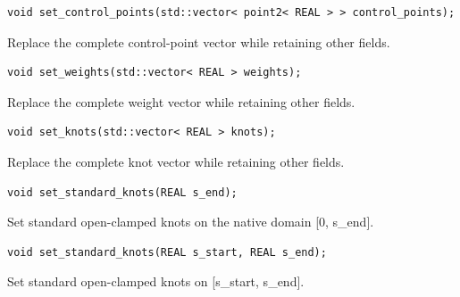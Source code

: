 \par\noindent\begin{minipage}{\linewidth}
\begin{lstlisting}[style=apireference]
void set_control_points(std::vector< point2< REAL > > control_points);
\end{lstlisting}
{\footnotesize Replace the complete control-point vector while retaining other fields.\par}
\end{minipage}\par\vspace{1pt}
\par\noindent\begin{minipage}{\linewidth}
\begin{lstlisting}[style=apireference]
void set_weights(std::vector< REAL > weights);
\end{lstlisting}
{\footnotesize Replace the complete weight vector while retaining other fields.\par}
\end{minipage}\par\vspace{1pt}
\par\noindent\begin{minipage}{\linewidth}
\begin{lstlisting}[style=apireference]
void set_knots(std::vector< REAL > knots);
\end{lstlisting}
{\footnotesize Replace the complete knot vector while retaining other fields.\par}
\end{minipage}\par\vspace{1pt}
\par\noindent\begin{minipage}{\linewidth}
\begin{lstlisting}[style=apireference]
void set_standard_knots(REAL s_end);
\end{lstlisting}
{\footnotesize Set standard open-clamped knots on the native domain [0, s\_end].\par}
\end{minipage}\par\vspace{1pt}
\par\noindent\begin{minipage}{\linewidth}
\begin{lstlisting}[style=apireference]
void set_standard_knots(REAL s_start, REAL s_end);
\end{lstlisting}
{\footnotesize Set standard open-clamped knots on [s\_start, s\_end].\par}
\end{minipage}\par\vspace{1pt}
